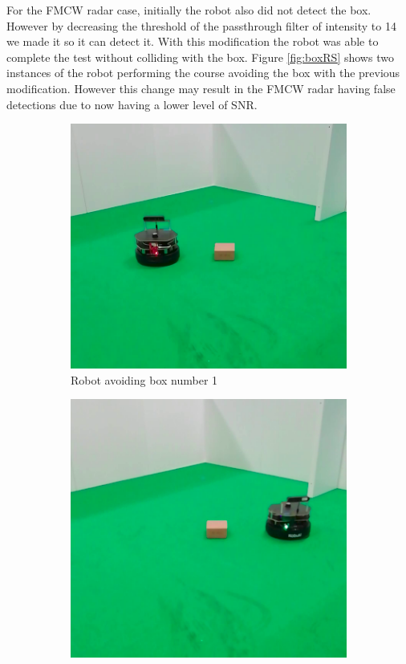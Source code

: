For the \ac{FMCW} \ac{radar} case, initially the robot also did not detect the box. However by decreasing the threshold of the passthrough filter of intensity to 14 we made it so it can detect it. With this modification the robot was able to complete the test without colliding with the box. Figure \ref{fig:boxRS} shows two instances of the robot performing the course avoiding the box with the previous modification. However this change may result in the \ac{FMCW} \ac{radar} having false detections due to now having a lower level of \ac{SNR}.

\begin{figure}[ht!]
  \centering
  \begin{subfigure}[b]{0.49\linewidth}
    \includegraphics[width=\linewidth]{imgs/chapter5/boxRS.png}
     \caption{Robot avoiding box number 1}
     \label{fig:boxRS1}
  \end{subfigure}
  \begin{subfigure}[b]{0.47\linewidth}
    \includegraphics[width=\linewidth]{imgs/chapter5/boxRS2.png}

\end{subfigure}
\end{figure}
